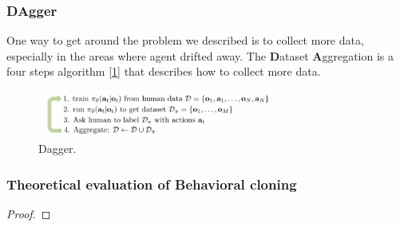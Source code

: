 \documentclass[a4paper]{article}
\begin{document}
\subsubsection*{DAgger}

One way to get around the problem we described is to collect more data, especially in the areas where agent drifted away. The \textbf{D}ataset \textbf{A}ggregation is a four steps algorithm [\ref{fig:dagger}] that describes how to collect more data.

\begin{figure}[h]
	\includegraphics[width=0.7\textwidth, center]{imgs_tex/dagger.png}
	\caption{Dagger.}
	\label{fig:dagger}
\end{figure}


\subsubsection*{Theoretical evaluation of Behavioral cloning}

\begin{proof}
\end{proof}
\end{document}
